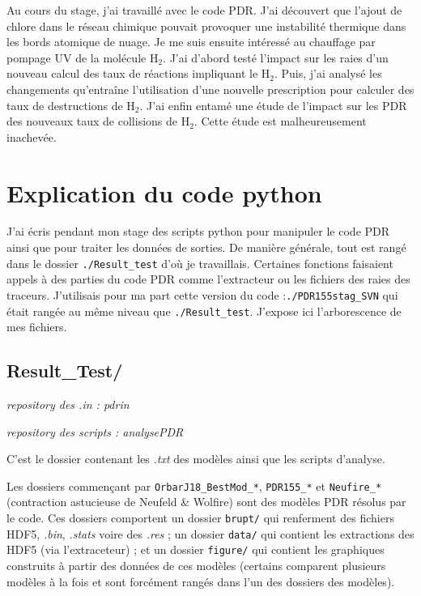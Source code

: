 \documentclass[11pt,a4paper,twoside,openright]{article}
\begin{document}
\begin{spacing}{0.98}
Au cours du stage, j'ai travaillé avec le code PDR. J'ai découvert que l'ajout de chlore dans le réseau chimique pouvait provoquer une instabilité thermique dans les bords atomique de nuage. Je me suis ensuite intéressé au chauffage par pompage UV de la molécule $\mathrm{H}_2$. J'ai d'abord testé l'impact sur les raies d'un nouveau calcul des taux de réactions impliquant le $\mathrm{H}_2$. Puis, j'ai analysé les changements qu'entraîne l'utilisation d'une nouvelle prescription pour calculer des taux de destructions de $\mathrm{H}_2$. J'ai enfin entamé une étude de l'impact sur les PDR des nouveaux taux de collisions de $\mathrm{H}_2$. Cette étude est malheureusement inachevée.






\setcounter{secnumdepth}{4}
\clearpage

\clearpage



\clearpage
\section{Explication du code python}
J'ai écris pendant mon stage des scripts python pour manipuler le code PDR ainsi que pour traiter les données de sorties. De manière générale, tout est rangé dans le dossier \texttt{./Result\_test} d'où je travaillais. Certaines fonctions faisaient appels à des parties du code PDR comme l'extracteur ou les fichiers des raies des traceurs. J'utilisais pour ma part cette version du code :\texttt{./PDR155stag\_SVN} qui était rangée au même niveau que \texttt{./Result\_test}. J'expose ici l'arborescence de mes fichiers. 

\subsection{Result\_Test/}

\textit{repository des .in : pdrin} 

\textit{repository des scripts : analysePDR} \newline 


C'est le dossier contenant les \textit{.txt} des modèles ainsi que les scripts d'analyse. \newline 

Les dossiers commençant par \texttt{OrbarJ18\_BestMod\_*}, \texttt{PDR155\_*} et \texttt{Neufire\_*} (contraction astucieuse de Neufeld \& Wolfire) sont des modèles PDR résolus par le code. Ces dossiers comportent un dossier \texttt{brupt/} qui renferment des fichiers HDF5, \textit{.bin}, \textit{.stats} voire des \textit{.res} ; un dossier \texttt{data/} qui contient les extractions des HDF5 (via l'extraceteur) ; et un dossier \texttt{figure/} qui contient les graphiques construits à partir des données de ces modèles (certains comparent plusieurs modèles à la fois et sont forcément rangés dans l'un des dossiers des modèles). \newline 


\end{spacing}
\end{document}
